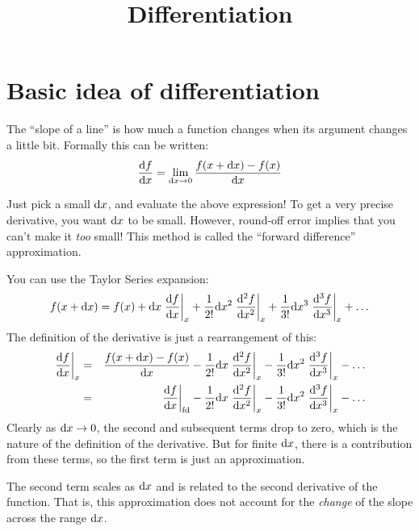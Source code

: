 \title{Differentiation}

\section{Basic idea of differentiation}


\begin{answer}
The ``slope of a line'' is how much a function changes when its
argument changes a little bit. Formally this can be written:
\begin{equation}
\frac{{\rm d}f}{{\rm d}x} = \lim_{{\rm d}x \rightarrow 0} \frac{f(x+{\rm d}x)
  - f(x)}{{\rm d}x}
\end{equation}
\end{answer}


\begin{answer}
  Just pick a small ${\rm d}x$, and evaluate the above expression! To
  get a very precise derivative, you want ${\rm d}x$ to be
  small. However, round-off error implies that you can't make it {\it
    too} small! This method is called the ``forward difference''
  approximation. 
\end{answer}


\begin{answer}
  You can use the Taylor Series expansion:
  \begin{equation}
    f(x + {\rm d}x) = f(x)
    + {\rm d}x \left.\frac{{\rm d}f}{{\rm d}x}\right|_{x} 
    + \frac{1}{2!} {\rm d}x^2 \left.\frac{{\rm d}^2f}{{\rm d}x^2}\right|_{x} 
    + \frac{1}{3!} {\rm d}x^3 \left.\frac{{\rm d}^3f}{{\rm d}x^3}\right|_{x} 
    + \ldots
  \end{equation}
  The definition of the derivative is just a rearrangement of this:
  \begin{eqnarray}
    \left.\frac{{\rm d}f}{{\rm d}x}\right|_{x} &=&
     \frac{f(x+{\rm d}x) - f(x)}{{\rm d}x}
     - \frac{1}{2!} {\rm d}x \left.\frac{{\rm d}^2f}{{\rm d}x^2}\right|_{x} 
     - \frac{1}{3!} {\rm d}x^2 \left.\frac{{\rm d}^3f}{{\rm d}x^3}\right|_{x} 
     - \ldots \cr
    &=&
     \left.\frac{{\rm d}f}{{\rm d}x}\right|_{\rm fd} 
     - \frac{1}{2!} {\rm d}x \left.\frac{{\rm d}^2f}{{\rm d}x^2}\right|_{x} 
     - \frac{1}{3!} {\rm d}x^2 \left.\frac{{\rm d}^3f}{{\rm d}x^3}\right|_{x} 
     - \ldots
  \end{eqnarray}
  Clearly as ${\rm d}x\rightarrow 0$, the second and subsequent terms
  drop to zero, which is the nature of the definition of the
  derivative. But for finite ${\rm d}x$, there is a contribution from
  these terms, so the first term is just an approximation.

  The second term scales as ${\rm d}x$ and is related to the second
  derivative of the function. That is, this approximation does not
  account for the {\it change} of the slope across the range ${\rm
    d}x$.
\end{answer}

